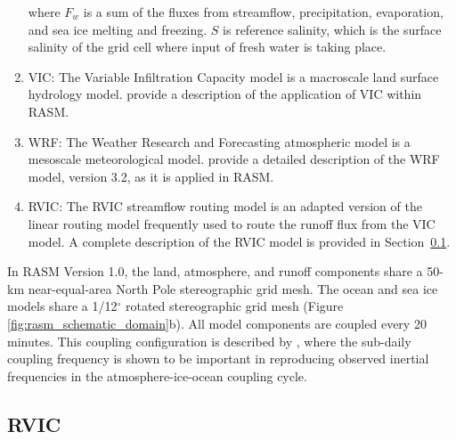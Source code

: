 \documentclass[jgrga, draft]{agutex}
\begin{document}
\begin{article}
\begin{enumerate}
where $F_w$ is a sum of the fluxes from streamflow, precipitation, evaporation, and sea ice melting and freezing. $S$ is reference salinity, which is the surface salinity of the grid cell where input of fresh water is taking place.

\item VIC: The Variable Infiltration Capacity model \citep{Liang_1994} is a macroscale land surface hydrology model.
\citet{Hamman_2016} provide a description of the application of VIC within RASM.
\item WRF: The Weather Research and Forecasting atmospheric model \citep{Skamarock_2007} is a mesoscale meteorological model.
\citet{Cassano_2016} provide a detailed description of the WRF model, version 3.2, as it is applied in RASM.
\item RVIC: The RVIC streamflow routing model is an adapted version of the \citet{Lohmann_1996} linear routing model frequently used to route the runoff flux from the VIC model.
A complete description of the RVIC model is provided in Section~\ref{sec:rvic}.
\end{enumerate}

In RASM Version 1.0, the land, atmosphere, and runoff components share a 50-km near-equal-area North Pole stereographic grid mesh.
The ocean and sea ice models share a 1/12$^{\circ}$ rotated stereographic grid mesh (Figure \ref{fig:rasm_schematic_domain}b).
All model components are coupled every 20 minutes.
This coupling configuration is described by \citet{Roberts_2015a}, where the sub-daily coupling frequency is shown to be important in reproducing observed inertial frequencies in the atmosphere-ice-ocean coupling cycle.

\subsection{RVIC}
\label{sec:rvic}


\end{article}
\end{document}
